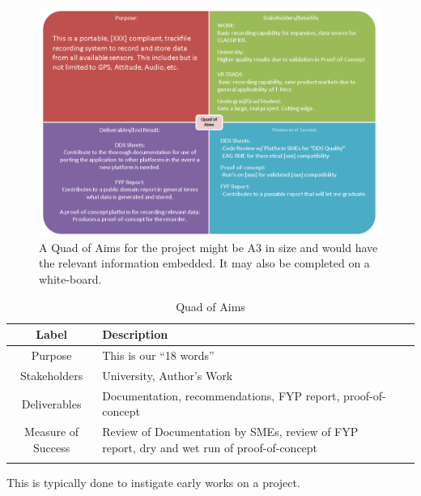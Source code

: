 \documentclass{UoNMCHA}
\numberwithin{equation}{section}
\begin{document}
\begin{figure}[h]
    \begin{center}
        \includegraphics[width=0.8\linewidth]{Figures/QuadOfAims2.png}
        \caption{A Quad of Aims for the project might be A3 in size and would have the relevant information embedded. It may also be completed on a white-board.}
        \label{fig:AndroidDataExample}
    \end{center}
 \end{figure}

 \begin{table}[h]
    \begin{center}
        \caption{Quad of Aims }\label{tab:QuadOfAims}
        {\footnotesize
            \begin{tabular}{c l l l|}
                \hline\hline Label & Description \\ \hline 
                Purpose & This is our “18 words” \\
                Stakeholders & University, Author’s Work \\
                Deliverables & Documentation, recommendations, FYP report, proof-of-concept \\
                Measure of Success & Review of Documentation by SMEs, review of FYP report, dry and wet run of proof-of-concept \\
                \\ \hline
            \end{tabular}
        }
    \end{center}
\end{table}

This is typically done to instigate early works on a project.
\end{document}

